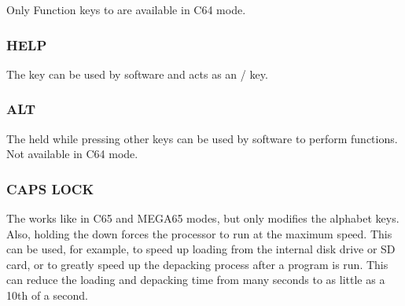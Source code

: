 Only Function keys  to  are available in C64 mode.

\subsubsection{HELP}

The  key can be used by software and acts as an  /  key.

\subsubsection{ALT}

The  held while pressing other keys can be used by software to perform functions. Not available in C64 mode.

\subsubsection{CAPS LOCK}

The  works like  in C65 and MEGA65 modes, but only modifies the alphabet keys. 
Also, holding the  down forces the processor to run at the maximum speed. This can be used, for example,
to speed up loading from the internal disk drive or SD card, or to greatly speed up the depacking process after a program is run.
This can reduce the loading and depacking time from many seconds to as little as a 10th of a second. 

